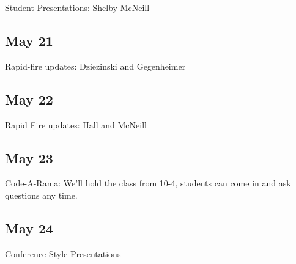\documentclass[10pt]{article}
\begin{document}
Student Presentations: Shelby McNeill


\subsection{May 21}

Rapid-fire updates: Dziezinski and Gegenheimer


\subsection{May 22}

Rapid Fire updates: Hall and McNeill


\subsection{May 23} 
Code-A-Rama: We'll hold the class from 10-4, students can come in and
ask questions any time. 


\subsection{May 24}

Conference-Style Presentations
\end{document}
